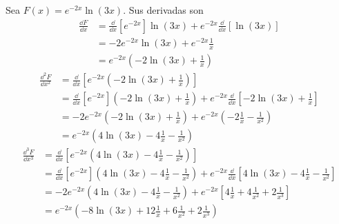 \documentclass{article}
\begin{document}
  Sea \(F(x) = e^{- 2 x} \ln(3 x)\).
  Sus derivadas son
  \begin{align}
    \frac{\dd F}{\dd x}
    &=
    \frac{\dd}{\dd x} [e^{- 2 x}] \ln(3 x)
      + e^{- 2 x} \frac{\dd}{\dd x} [\ln(3 x)]
    \\
    &=
    - 2 e^{- 2 x} \ln(3 x)
      + e^{- 2 x} \frac{1}{x}
    \\
    &=
    e^{- 2 x} \left(
      - 2  \ln(3 x)
      + \frac{1}{x} 
    \right)
  \end{align}
  \begin{align}
    \frac{\dd^2 F}{\dd x^2}
    &=
    \frac{\dd}{\dd x} \left[
      e^{- 2 x} \left(
        - 2  \ln(3 x)
        + \frac{1}{x}
      \right)
    \right]
    \\
    &=
    \frac{\dd}{\dd x} [e^{- 2 x}] \left(
        - 2 \ln(3 x)
        + \frac{1}{x}
      \right)
      + e^{- 2 x} \frac{\dd}{\dd x} \left[
        - 2 \ln(3 x)
        + \frac{1}{x}
      \right]
    \\
    &=
    - 2 e^{- 2 x} \left(
        - 2 \ln(3 x)
        + \frac{1}{x}
      \right)
      + e^{- 2 x} \left(
        - 2 \frac{1}{x}
        - \frac{1}{x^2}
      \right)
    \\
    &=
    e^{- 2 x} \left(
      4 \ln(3 x)
      -4 \frac{1}{x}
      - \frac{1}{x^2}
    \right)
  \end{align}
  \begin{align}
    \frac{\dd^3 F}{\dd x^3}
    &=
    \frac{\dd}{\dd x} \left[
      e^{- 2 x} \left(
        4 \ln(3 x)
        -4 \frac{1}{x}
        - \frac{1}{x^2}
      \right)  
    \right]
    \\
    &=
    \frac{\dd}{\dd x} [e^{- 2 x}] \left(
      4 \ln(3 x)
      - 4 \frac{1}{x}
      - \frac{1}{x^2}
    \right)
      + e^{- 2 x} \frac{\dd}{\dd x} \left[
        4 \ln(3 x)
        - 4 \frac{1}{x}
        - \frac{1}{x^2}
      \right]
    \\
    &=
    - 2 e^{- 2 x} \left(
      4 \ln(3 x)
      - 4 \frac{1}{x}
      - \frac{1}{x^2}
    \right)
      + e^{- 2 x} \left[
        4 \frac{1}{x}
        + 4 \frac{1}{x^2}
        + 2 \frac{1}{x^3}
      \right]
    \\
    &=
    e^{- 2 x} \left(
      - 8 \ln(3 x)
      + 12 \frac{1}{x}
      + 6 \frac{1}{x^2}
      + 2 \frac{1}{x^3}
    \right)
  \end{align}
\end{document}
